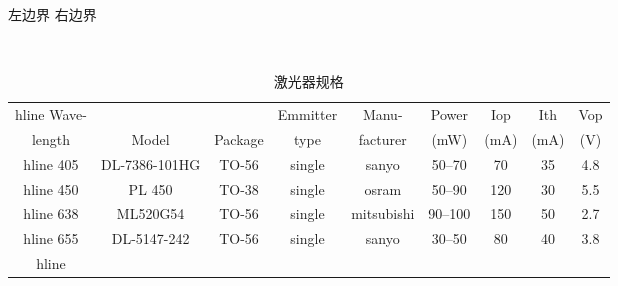 \documentclass{ctexart}
\begin{document}
 
\noindent 左边界 
\hfill 右边界 %
\begin{table}[!htbp] 
    \centering 
    \setlength
    \tabcolsep{2pt}%
    \addtolength{\tabcolsep}{20pt}%
    \caption{激光器规格}
    \label{tab:Laser_Specs} \
        \begin{tabular}{|c|c|c|c|c|c|c|c|c|} 
            \\hline Wave-& & & Emmitter & Manu- & Power & Iop & Ith & Vop \\
            [-3pt]%
            length& Model & Package & type & facturer & (mW) & (mA) & (mA) & (V)\\
            hline 405 & DL-7386-101HG & TO-56 & single & sanyo & 50--70 & 70 & 35 & 4.8\\
            hline 450 & PL 450 & TO-38 & single & osram & 50--90 & 120 & 30 & 5.5\\
            hline 638 & ML520G54 & TO-56 & single & mitsubishi & 90--100 & 150 & 50 & 2.7\\
            hline 655 & DL-5147-242 & TO-56 & single & sanyo & 30--50 & 80 & 40 & 3.8\\
            hline 
        \end{tabular} 
    \end{table} 
\end{document}
